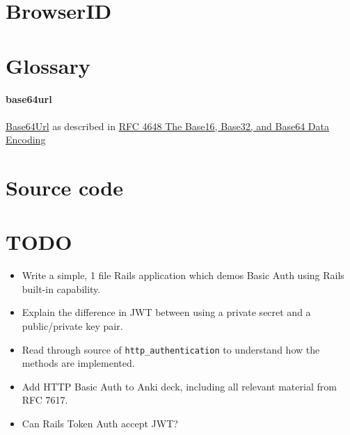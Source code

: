 \documentclass{article}
\begin{document}
\section{BrowserID}

\appendix

\section{Glossary}

\paragraph{base64url} \href{https://en.wikipedia.org/wiki/Base64#URL_applications}{%
  Base64Url} as described in \href{https://tools.ietf.org/html/rfc4648}{%
    RFC 4648 The Base16, Base32, and Base64 Data Encoding}

\section{Source code}

\section{TODO}

\begin{itemize}
  \item Write a simple, 1 file Rails application which demos Basic Auth
    using Rails built-in capability.
  \item Explain the difference in JWT between using a private secret and a
    public/private key pair.
  \item Read through source of \texttt{http\_authentication} to understand how
    the methods are implemented.
  \item Add HTTP Basic Auth to Anki deck, including all relevant material from
    RFC 7617.
  \item Can Rails Token Auth accept JWT?
\end{itemize}
\end{document}
